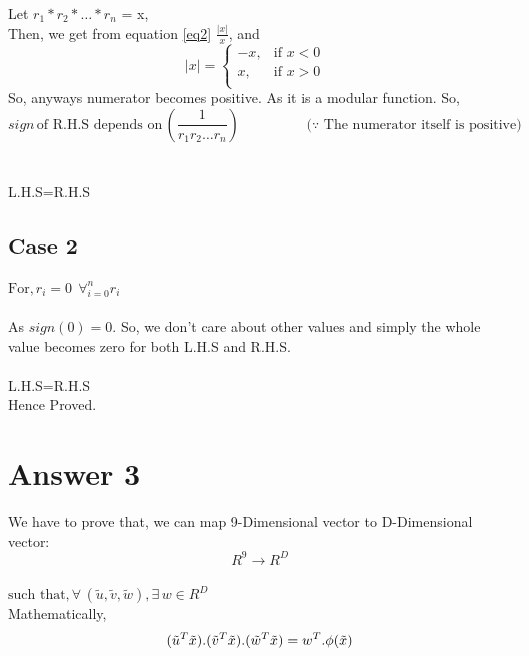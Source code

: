\documentclass{article}
\begin{document}
Let $r_1*r_2* \dots *r_n $ = x,\\
Then, we get from equation \ref{eq2}  $\frac{|x|}{x}$, and \\
$$
|x|=\begin{cases}
			-x, & \text{if $x<0$ }\\
            x, & \text{if $x>0$}\\
		 \end{cases}
$$
So, anyways numerator becomes positive. As it is a modular function. So, \\
\[ sign \, \text{of R.H.S depends on} \, (\frac{1}{r_1r_2 \dots r_n}) \hspace{2cm} \text{($\because$ The numerator itself is positive)} \]\\\\
\hspace*{6cm}  L.H.S=R.H.S\\ %

\subsection{Case 2} 

$\text{For,} \,  r_i = 0  \;\, \forall_{i=0}^n r_i $ \\\\ As $sign(0)=0$. So, we don't care about other values and simply the whole value becomes zero for both L.H.S and R.H.S.\\\\
\hspace*{6cm}  L.H.S=R.H.S\\
\hspace*{6cm} Hence Proved.



\section{Answer 3}%
We have to prove that, we can map 9-Dimensional vector to D-Dimensional vector:\\
\[R^9 \to R^D\]
\\
$\text{such that,} \, \forall \, (\tilde{u},\tilde{v},\tilde{w}), \exists \, w \in R^D$\\ %
Mathematically,
\begin{equation}
(\tilde{u}^T\tilde{x}).(\tilde{v}^T\tilde{x}).(\tilde{w}^T\tilde{x}) = w^T.\phi(\tilde{x})\\
\end{equation}
\end{document}
